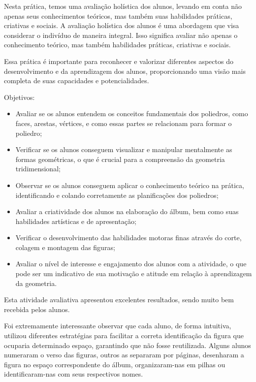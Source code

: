 Nesta prática, temos uma avaliação holística dos alunos, levando em conta não apenas seus conhecimentos teóricos, mas também suas habilidades práticas, criativas e sociais. A avaliação holística dos alunos é uma abordagem que visa considerar o indivíduo de maneira integral. Isso significa avaliar não apenas o conhecimento teórico, mas também habilidades práticas, criativas e sociais.

Essa prática é importante para reconhecer e valorizar diferentes aspectos do desenvolvimento e da aprendizagem dos alunos, proporcionando uma visão mais completa de suas capacidades e potencialidades.

Objetivos:

\begin{itemize}
    \item Avaliar se os alunos entendem os conceitos fundamentais dos poliedros, como faces, arestas, vértices, e como essas partes se relacionam para formar o poliedro;
    \item Verificar se os alunos conseguem visualizar e manipular mentalmente as formas geométricas, o que é crucial para a compreensão da geometria tridimensional;
    \item Observar se os alunos conseguem aplicar o conhecimento teórico na prática, identificando e colando corretamente as planificações dos poliedros;
    \item Avaliar a criatividade dos alunos na elaboração do álbum, bem como suas habilidades artísticas e de apresentação;
    \item Verificar o desenvolvimento das habilidades motoras finas através do corte, colagem e montagem das figuras;
    \item Avaliar o nível de interesse e engajamento dos alunos com a atividade, o que pode ser um indicativo de sua motivação e atitude em relação à aprendizagem da geometria.
\end{itemize}

Esta atividade avaliativa apresentou excelentes resultados, sendo muito bem recebida pelos alunos.

Foi extremamente interessante observar que cada aluno, de forma intuitiva, utilizou diferentes estratégias para facilitar a correta identificação da figura que ocuparia determinado espaço, garantindo que não fosse reutilizada. Alguns alunos numeraram o verso das figuras, outros as separaram por páginas, desenharam a figura no espaço correspondente do álbum, organizaram-nas em pilhas ou identificaram-nas com seus respectivos nomes.

